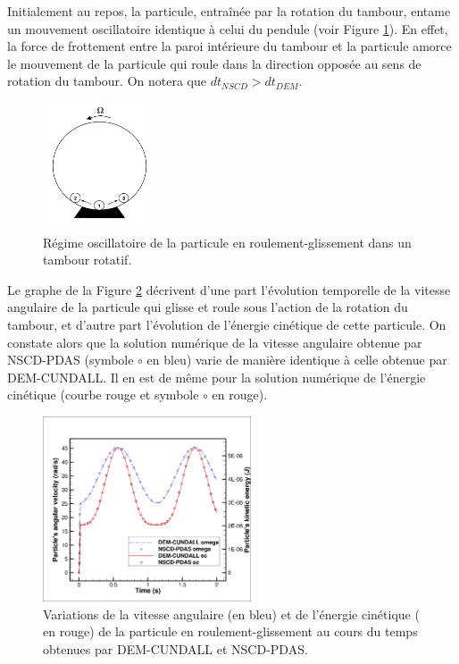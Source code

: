 Initialement au repos, la particule, entraînée par la rotation du tambour, entame un mouvement oscillatoire identique à celui du pendule (voir Figure \ref{fig94}). En effet, la force de frottement entre la paroi intérieure du tambour et la particule amorce le mouvement de la particule qui roule dans la direction opposée au sens de rotation du tambour. On notera que $dt_{NSCD}>dt_{DEM}$.

\begin{figure}[!h]
  \centering
    \includegraphics[width=0.3\textwidth]{chapitres/chapitre_4/figures/roulement_glissement_tambour.png}
    \caption{\centering Régime oscillatoire de la particule en roulement-glissement dans un tambour rotatif.}\label{fig94}
\end{figure}

Le graphe de la Figure \ref{fig104} décrivent d'une part l'évolution temporelle de la vitesse angulaire de la particule qui glisse et roule sous l'action de la rotation du tambour, et d'autre part l'évolution de l'énergie cinétique de cette particule. On constate alors que la solution numérique de la vitesse angulaire obtenue par NSCD-PDAS (symbole $\circ$ en bleu) varie de manière identique à celle obtenue par DEM-CUNDALL. Il en est de même pour la solution numérique de l'énergie cinétique (courbe rouge et symbole $\circ$ en rouge).

\begin{figure}[!h]
  \centering
    \includegraphics[width=0.55\textwidth]{chapitres/chapitre_4/figures/ec-omega_roll-slide.png}
    \caption{\centering Variations de la vitesse angulaire (en bleu) et de l'énergie cinétique ( en rouge) de la particule en roulement-glissement au cours du temps obtenues par DEM-CUNDALL et NSCD-PDAS.}\label{fig104}
\end{figure}

